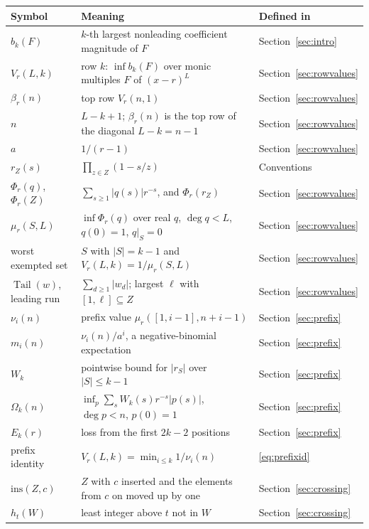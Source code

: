 \documentclass[11pt]{article}
\DeclareMathOperator{\Tail}{Tail}
\begin{document}
\begin{table}[tp]
\centering
\small
\renewcommand{\arraystretch}{1.15}
\begin{tabular}{@{}l p{} l@{}}
\hline
Symbol & Meaning & Defined in\\
\hline
$b_k(F)$ & $k$-th largest nonleading coefficient magnitude of $F$
  & Section~\ref{sec:intro}\\
$V_r(L,k)$ & row $k$: $\inf b_k(F)$ over monic multiples $F$ of $(x-r)^L$
  & Section~\ref{sec:rowvalues}\\
$\beta_r(n)$ & top row $V_r(n,1)$ & Section~\ref{sec:rowvalues}\\
$n$ & $L-k+1$; $\beta_r(n)$ is the top row of the diagonal $L-k=n-1$
  & Section~\ref{sec:rowvalues}\\
$a$ & $1/(r-1)$ & Section~\ref{sec:rowvalues}\\
$r_Z(s)$ & $\prod_{z\in Z}(1-s/z)$ & Conventions\\
$\Phi_r(q)$, $\Phi_r(Z)$ & $\sum_{s\ge1}|q(s)|r^{-s}$, and $\Phi_r(r_Z)$
  & Section~\ref{sec:rowvalues}\\
$\mu_r(S,L)$ & $\inf\Phi_r(q)$ over real $q$, $\deg q<L$, $q(0)=1$, $q|_S=0$
  & Section~\ref{sec:rowvalues}\\
worst exempted set & $S$ with $|S|=k-1$ and $V_r(L,k)=1/\mu_r(S,L)$
  & Section~\ref{sec:rowvalues}\\
$\Tail(w)$, leading run & $\sum_{d\ge1}|w_d|$; largest $\ell$ with
  $[1,\ell]\subseteq Z$ & Section~\ref{sec:rowvalues}\\
$\nu_i(n)$ & prefix value $\mu_r([1,i-1],n+i-1)$ & Section~\ref{sec:prefix}\\
$m_i(n)$ & $\nu_i(n)/a^i$, a negative-binomial expectation
  & Section~\ref{sec:prefix}\\
$W_k$ & pointwise bound for $|r_S|$ over $|S|\le k-1$
  & Section~\ref{sec:prefix}\\
$\Omega_k(n)$ & $\inf_p\sum_sW_k(s)r^{-s}|p(s)|$, $\deg p<n$, $p(0)=1$
  & Section~\ref{sec:prefix}\\
$E_k(r)$ & loss from the first $2k-2$ positions & Section~\ref{sec:prefix}\\
prefix identity & $V_r(L,k)=\min_{i\le k}1/\nu_i(n)$
  & \eqref{eq:prefixid}\\
$\mathrm{ins}(Z,c)$ & $Z$ with $c$ inserted and the elements from $c$ on
  moved up by one & Section~\ref{sec:crossing}\\
$h_t(W)$ & least integer above $t$ not in $W$ & Section~\ref{sec:crossing}\\

\end{tabular}
\end{table}
\end{document}
